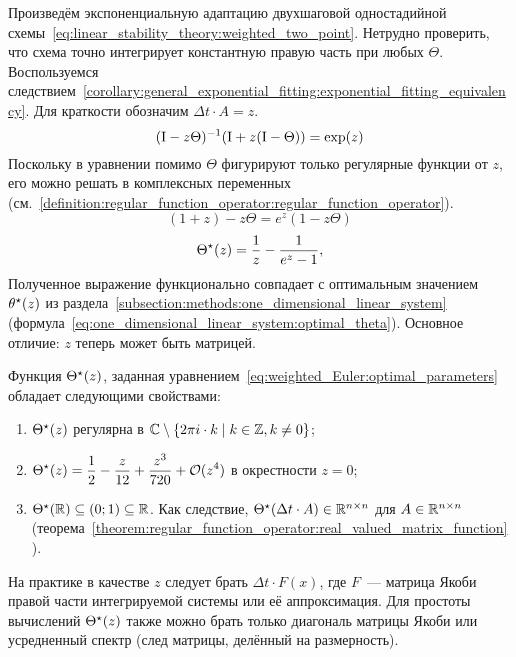 Произведём экспоненциальную адаптацию двухшаговой одностадийной схемы~\eqref{eq:linear_stability_theory:weighted_two_point}.
Нетрудно проверить, что схема точно интегрирует константную правую часть при любых $ \Theta $.
Воспользуемся следствием~\ref{corollary:general_exponential_fitting:exponential_fitting_equivalency}.
Для краткости обозначим $ \Delta t \cdot A = z $.
\[
    (\mathrm{I} - z \Theta)^{-1} (\mathrm{I} + z (\mathrm{I} - \Theta)) = \exp(z)
\]
Поскольку в уравнении помимо $ \Theta $ фигурируют только регулярные функции от $ z $,
его можно решать в комплексных переменных
(см.~\ref{definition:regular_function_operator:regular_function_operator}).
\[
    (1 + z) - z \Theta = e^z (1 - z \Theta)
\]
%
\begin{equation}
    \label{eq:weighted_Euler:optimal_parameters}
    \Theta^\star(z) = \frac{1}{z} - \frac{1}{e^z - 1},
\end{equation}
%
Полученное выражение функционально совпадает с оптимальным значением $ \theta^\star(z) $
из раздела~\ref{subsection:methods:one_dimensional_linear_system}
(формула~\eqref{eq:one_dimensional_linear_system:optimal_theta}).
Основное отличие: $ z $ теперь может быть матрицей.

\begin{remark}
    \label{remark:weighted_Euler:optimal_parameters_properties}
    Функция $ \Theta^\star(z) $, заданная уравнением~\eqref{eq:weighted_Euler:optimal_parameters}
    обладает следующими свойствами:
    \begin{enumerate}
        \item $ \Theta^\star(z) $ регулярна в $ \mathbb{C} \setminus \{ 2 \pi i \cdot k \mid k \in \mathbb{Z}, k \neq 0 \} $;
        \item $ \displaystyle \Theta^\star(z) = \frac{1}{2} - \frac{z}{12} + \frac{z^3}{720} + \mathcal{O}(z^4) $
            в окрестности $ z = 0 $;
        \item $ \Theta^\star(\mathbb{R}) \subseteq (0; 1) \subseteq \mathbb{R} $.
            Как следствие, $ \Theta^\star(\Delta t \cdot A) \in \mathbb{R}^{n \times n} $ для $ A \in \mathbb{R}^{n \times n} $
            (теорема~\ref{theorem:regular_function_operator:real_valued_matrix_function}).
    \end{enumerate}
\end{remark}

На практике в качестве $ z $ следует брать $ \Delta t \cdot F(x) $,
где $ F $~--- матрица Якоби правой части интегрируемой системы или её аппроксимация.
Для простоты вычислений $ \Theta^\star(z) $ также можно брать только диагональ матрицы Якоби
или усредненный спектр (след матрицы, делённый на размерность).


